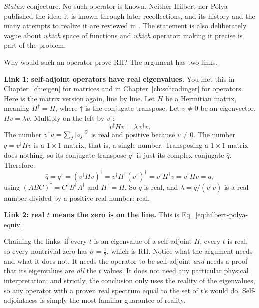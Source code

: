 \emph{Status:} conjecture. No such operator is known. Neither Hilbert nor P\'olya published the idea; it is known through later recollections, and its history and the many attempts to realize it are reviewed in \cite{schumayer}. The statement is also deliberately vague about \emph{which} space of functions and \emph{which} operator: making it precise is part of the problem.
\medskip

Why would such an operator prove RH? The argument has two links.

\textbf{Link 1: self-adjoint operators have real eigenvalues.} You met this in Chapter~\ref{ch:eigen} for matrices and in Chapter~\ref{ch:schrodinger} for operators. Here is the matrix version again, line by line. Let $H$ be a Hermitian matrix, meaning $H^\dagger=H$, where $\dagger$ is the conjugate transpose. Let $v\neq0$ be an eigenvector, $Hv=\lambda v$. Multiply on the left by $v^\dagger$:
\begin{equation}
v^\dagger H v=\lambda\, v^\dagger v .
\label{eq:hilbert-polya-real1}
\end{equation}
The number $v^\dagger v=\sum_j\left\lvert v_j\right\rvert^2$ is real and positive because $v\ne0$. The number $q=v^\dagger Hv$ is a $1\times1$ matrix, that is, a single number. Transposing a $1\times1$ matrix does nothing, so its conjugate transpose $q^\dagger$ is just its complex conjugate $\bar q$. Therefore:
\begin{equation}
\bar q=q^\dagger=(v^\dagger Hv)^\dagger=v^\dagger H^\dagger (v^\dagger)^\dagger=v^\dagger H^\dagger v=v^\dagger Hv=q,
\label{eq:hilbert-polya-real2}
\end{equation}
using $(ABC)^\dagger=C^\dagger B^\dagger A^\dagger$ and $H^\dagger=H$. So $q$ is real, and $\lambda=q/(v^\dagger v)$ is a real number divided by a positive real number: real.

\textbf{Link 2: real $t$ means the zero is on the line.} This is Eq.~\eqref{eq:hilbert-polya-equiv}.

Chaining the links: if every $t$ is an eigenvalue of a self-adjoint $H$, every $t$ is real, so every nontrivial zero has $\sigma=\tfrac12$, which is RH. Notice what the argument needs and what it does not. It needs the operator to be self-adjoint \emph{and} needs a proof that its eigenvalues are \emph{all} the $t$ values. It does not need any particular physical interpretation; and strictly, the conclusion only uses the reality of the eigenvalues, so any operator with a proven real spectrum equal to the set of $t$'s would do. Self-adjointness is simply the most familiar guarantee of reality.

